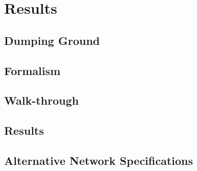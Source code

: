 \chapter{Results}
\label{chap:results}

\section*{Dumping Ground}

\begin{figure}[H]

\end{figure}

\begin{figure}[H]

\end{figure}

\begin{figure}[H]

\end{figure}

\begin{figure}[H]

\end{figure}

\TODO

\section{Formalism}
\section{Walk-through}
\section{Results}
\section{Alternative Network Specifications}
